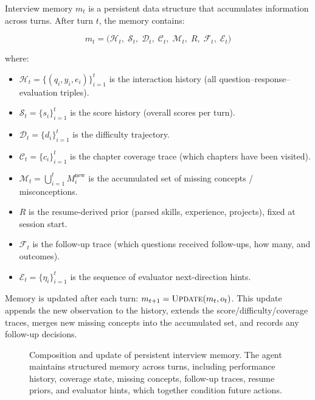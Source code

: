 ﻿\documentclass[final,3p,times,authoryear]{elsarticle}
\begin{document}
\noindent Interview memory $m_t$ is a persistent data structure that accumulates information across turns. After turn $t$, the memory contains:

\begin{equation}
m_t = \bigl(\mathcal{H}_t,\; \mathcal{S}_t,\; \mathcal{D}_t,\; \mathcal{C}_t,\; \mathcal{M}_t,\; R,\; \mathcal{F}_t,\; \mathcal{E}_t\bigr)
\end{equation}

where:
\begin{itemize}
    \item $\mathcal{H}_t = \{(q_i, y_i, e_i)\}_{i=1}^{t}$ is the interaction history (all question--response--evaluation triples).
    \item $\mathcal{S}_t = \{s_i\}_{i=1}^{t}$ is the score history (overall scores per turn).
    \item $\mathcal{D}_t = \{d_i\}_{i=1}^{t}$ is the difficulty trajectory.
    \item $\mathcal{C}_t = \{c_i\}_{i=1}^{t}$ is the chapter coverage trace (which chapters have been visited).
    \item $\mathcal{M}_t = \bigcup_{i=1}^{t} M_i^{\text{new}}$ is the accumulated set of missing concepts / misconceptions.
    \item $R$ is the resume-derived prior (parsed skills, experience, projects), fixed at session start.
    \item $\mathcal{F}_t$ is the follow-up trace (which questions received follow-ups, how many, and outcomes).
    \item $\mathcal{E}_t = \{\eta_i\}_{i=1}^{t}$ is the sequence of evaluator next-direction hints.
\end{itemize}

Memory is updated after each turn: $m_{t+1} = \textsc{Update}(m_t, o_t)$. This update appends the new observation to the history, extends the score/difficulty/coverage traces, merges new missing concepts into the accumulated set, and records any follow-up decisions.

\begin{figure}[t]
\centering
\resizebox{\textwidth}{!}{}
\caption{Composition and update of persistent interview memory. The agent maintains structured memory across turns, including performance history, coverage state, missing concepts, follow-up traces, resume priors, and evaluator hints, which together condition future actions.}
\label{fig:memory_state}
\end{figure}
\end{document}
